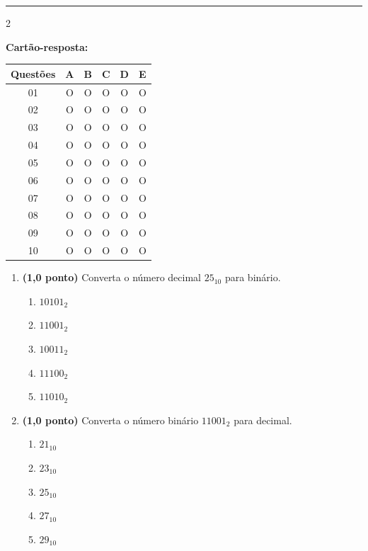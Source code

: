\documentclass[a4paper,12pt]{article}
\begin{document}
\vspace{0.5cm}
\noindent\rule{\textwidth}{1pt}

\begin{multicols}{2}
\raggedcolumns

\textbf{Cartão-resposta:}

\vspace{0.2cm}

\begin{tabular}{|c|c|c|c|c|c|}
\hline
\textbf{Questões} & A & B & C & D & E \\
\hline
01 & O & O & O & O & O \\
\hline
02 & O & O & O & O & O \\
\hline
03 & O & O & O & O & O \\
\hline
04 & O & O & O & O & O \\
\hline
05 & O & O & O & O & O \\
\hline
06 & O & O & O & O & O \\
\hline
07 & O & O & O & O & O \\
\hline
08 & O & O & O & O & O \\
\hline
09 & O & O & O & O & O \\
\hline
10 & O & O & O & O & O \\
\hline
\end{tabular}

\vspace{0.7cm}

\begin{enumerate}[leftmargin=*]

\item \textbf{(1,0 ponto)} Converta o número decimal $25_{10}$ para binário.

\begin{enumerate}[label=(\Alph*)]
    \item $10101_2$
    \item $11001_2$
    \item $10011_2$
    \item $11100_2$
    \item $11010_2$
\end{enumerate}

\vspace{0.2cm}

\item \textbf{(1,0 ponto)} Converta o número binário $11001_2$ para decimal.

\begin{enumerate}[label=(\Alph*)]
    \item $21_{10}$
    \item $23_{10}$
    \item $25_{10}$
    \item $27_{10}$
    \item $29_{10}$
\end{enumerate}


\end{enumerate}
\end{multicols}
\end{document}
